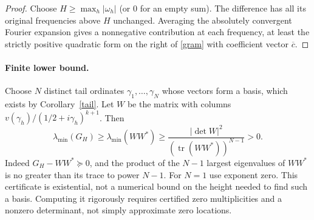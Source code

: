 \documentclass[11pt]{article}
\theoremstyle{remark}\newtheorem{remark}[theorem]{Remark}
\begin{document}
\begin{proof}
Choose $H\ge\max_h|\omega_h|$ (or $0$ for an empty sum). The difference has all its original frequencies above $H$ unchanged. Averaging the absolutely convergent Fourier expansion gives a nonnegative contribution at each frequency, at least the strictly positive quadratic form on the right of \eqref{gram} with coefficient vector $\overline c$.
\end{proof}

\paragraph{Finite lower bound.} Choose $N$ distinct tail ordinates $\gamma_1,\ldots,\gamma_N$ whose vectors form a basis, which exists by Corollary~\ref{tail}. Let $W$ be the matrix with columns $v(\gamma_h)/(1/2+i\gamma_h)^{k+1}$. Then
\begin{equation}\label{cert}
 \lambda_{\min}(G_H)\ge \lambda_{\min}(WW^*)\ge
 \frac{|\det W|^2}{(\operatorname{tr}(WW^*))^{N-1}}>0.
\end{equation}
Indeed $G_H-WW^*\succeq0$, and the product of the $N-1$ largest eigenvalues of $WW^*$ is no greater than its trace to power $N-1$. For $N=1$ use exponent zero. This certificate is existential, not a numerical bound on the height needed to find such a basis. Computing it rigorously requires certified zero multiplicities and a nonzero determinant, not simply approximate zero locations.
\end{document}
